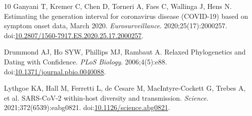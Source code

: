 \documentclass[11pt,a4paper]{article}
\begin{document}
\begin{thebibliography}{10}
Ganyani T, Kremer C, Chen D, Torneri A, Faes C, Wallinga J, Hens N.
Estimating the generation interval for coronavirus disease (COVID-19) based on symptom onset data, March 2020.
\textit{Eurosurveillance}. 2020;25(17):2000257.
doi:\href{https://doi.org/10.2807/1560-7917.ES.2020.25.17.2000257}{10.2807/1560-7917.ES.2020.25.17.2000257}.

Drummond AJ, Ho SYW, Phillips MJ, Rambaut A.
Relaxed Phylogenetics and Dating with Confidence.
\textit{PLoS Biology}. 2006;4(5):e88.
doi:\href{https://doi.org/10.1371/journal.pbio.0040088}{10.1371/journal.pbio.0040088}.

Lythgoe KA, Hall M, Ferretti L, de Cesare M, MacIntyre-Cockett G, Trebes A, et al.
SARS-CoV-2 within-host diversity and transmission.
\textit{Science}. 2021;372(6539):eabg0821.
doi:\href{https://doi.org/10.1126/science.abg0821}{10.1126/science.abg0821}.

\end{thebibliography}
\end{document}
